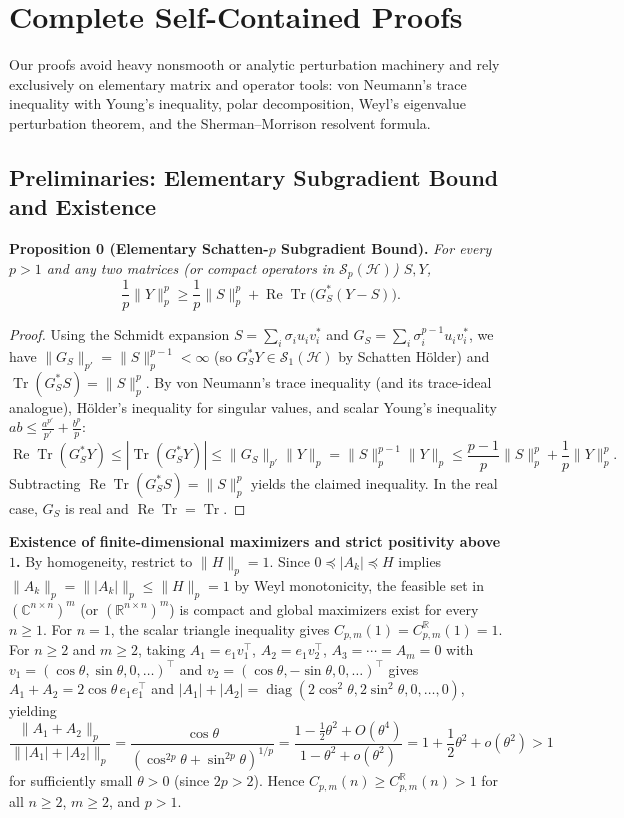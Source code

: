 \documentclass[10pt,letterpaper]{article}
\newcommand{\C}{\mathbb{C}}
\newcommand{\R}{\mathbb{R}}
\newcommand{\Hilb}{\mathcal{H}}
\newcommand{\Sp}{\mathcal{S}_p}
\newcommand{\Tr}{\operatorname{Tr}}
\newcommand{\diag}{\operatorname{diag}}
\begin{document}
\section{Complete Self-Contained Proofs}

Our proofs avoid heavy nonsmooth or analytic perturbation machinery and rely exclusively on elementary matrix and operator tools: von Neumann's trace inequality with Young's inequality, polar decomposition, Weyl's eigenvalue perturbation theorem, and the Sherman--Morrison resolvent formula.

\subsection{Preliminaries: Elementary Subgradient Bound and Existence}

\begin{tcolorbox}[lemmabox]
\textbf{Proposition 0 (Elementary Schatten-$p$ Subgradient Bound).}
\emph{For every $p > 1$ and any two matrices (or compact operators in $\Sp(\Hilb)$) $S, Y$,}
\[
  \frac{1}{p}\|Y\|_p^p \ge \frac{1}{p}\|S\|_p^p + \operatorname{Re}\Tr\bigl(G_S^*(Y - S)\bigr).
\]
\end{tcolorbox}

\begin{proof}
Using the Schmidt expansion $S = \sum_i \sigma_i u_i v_i^*$ and $G_S = \sum_i \sigma_i^{p-1} u_i v_i^*$, we have $\|G_S\|_{p'} = \|S\|_p^{p-1} < \infty$ (so $G_S^* Y \in \mathcal{S}_1(\Hilb)$ by Schatten H\"older) and $\Tr(G_S^* S) = \|S\|_p^p$. By von Neumann's trace inequality (and its trace-ideal analogue), H\"older's inequality for singular values, and scalar Young's inequality $ab \le \frac{a^{p'}}{p'} + \frac{b^p}{p}$:
\[
  \operatorname{Re}\Tr(G_S^* Y) \le |\Tr(G_S^* Y)| \le \|G_S\|_{p'}\|Y\|_p = \|S\|_p^{p-1}\|Y\|_p \le \frac{p-1}{p}\|S\|_p^p + \frac{1}{p}\|Y\|_p^p.
\]
Subtracting $\operatorname{Re}\Tr(G_S^* S) = \|S\|_p^p$ yields the claimed inequality. In the real case, $G_S$ is real and $\operatorname{Re}\Tr = \Tr$.
\end{proof}

\textbf{Existence of finite-dimensional maximizers and strict positivity above~$1$.}
By homogeneity, restrict to $\|H\|_p = 1$. Since $0 \preceq |A_k| \preceq H$ implies $\|A_k\|_p = \||A_k|\|_p \le \|H\|_p = 1$ by Weyl monotonicity, the feasible set in $(\C^{n\times n})^m$ (or $(\R^{n\times n})^m$) is compact and global maximizers exist for every $n \ge 1$. For $n = 1$, the scalar triangle inequality gives $C_{p,m}(1) = C_{p,m}^{\R}(1) = 1$. For $n \ge 2$ and $m \ge 2$, taking $A_1 = e_1 v_1^\top$, $A_2 = e_1 v_2^\top$, $A_3 = \cdots = A_m = 0$ with $v_1 = (\cos\theta, \sin\theta, 0,\dots)^\top$ and $v_2 = (\cos\theta, -\sin\theta, 0,\dots)^\top$ gives $A_1 + A_2 = 2\cos\theta\,e_1 e_1^\top$ and $|A_1|+|A_2| = \diag(2\cos^2\theta, 2\sin^2\theta, 0,\dots,0)$, yielding
\[
  \frac{\|A_1 + A_2\|_p}{\||A_1| + |A_2|\|_p}
  = \frac{\cos\theta}{(\cos^{2p}\theta + \sin^{2p}\theta)^{1/p}}
  = \frac{1 - \frac{1}{2}\theta^2 + O(\theta^4)}{1 - \theta^2 + o(\theta^2)}
  = 1 + \frac{1}{2}\theta^2 + o(\theta^2) > 1
\]
for sufficiently small $\theta > 0$ (since $2p > 2$). Hence $C_{p,m}(n) \ge C_{p,m}^{\R}(n) > 1$ for all $n \ge 2$, $m \ge 2$, and $p > 1$.
\end{document}
